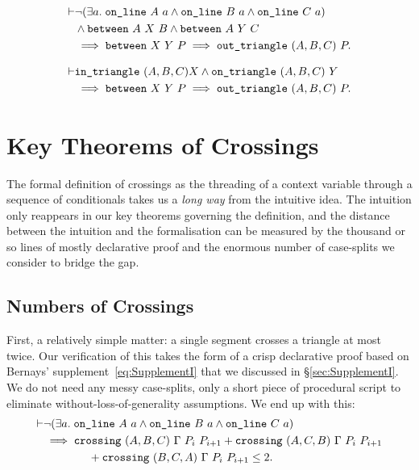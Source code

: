 \begin{equation}\label{eq:outTriangle1}
  \begin{split}
    \vdash&\neg(\exists a.\; \texttt{on\_line}\ A\ a\wedge \texttt{on\_line}\ B\ a\wedge \texttt{on\_line}\ C\ a)\\
    &\wedge \texttt{between}\ A\ X\ B \wedge \texttt{between}\ A\ Y\ C\\
    &\implies \texttt{between}\ X\ Y\ P \implies \texttt{out\_triangle}\ (A,B,C)\ P.
  \end{split}
\end{equation}

\begin{equation}\label{eq:outTriangle2}
  \begin{split}
    \vdash&\texttt{in\_triangle}\ (A,B,C) X \wedge \texttt{on\_triangle}\ (A,B,C)\ Y\\
    &\implies \texttt{between}\ X\ Y\ P \implies \texttt{out\_triangle}\ (A,B,C)\ P.
  \end{split}
\end{equation}

\section{Key Theorems of Crossings}\label{sec:CrossingVerification}
The formal definition of crossings as the threading of a context variable through a sequence of conditionals takes us a \emph{long way} from the intuitive idea. The intuition only reappears in our key theorems governing the definition, and the distance between the intuition and the formalisation can be measured by the thousand or so lines of mostly declarative proof and the enormous number of case-splits we consider to bridge the gap.

\subsection{Numbers of Crossings}
First, a relatively simple matter: a single segment crosses a triangle at most twice. Our verification of this takes the form of a crisp declarative proof based on Bernays' supplement~\eqref{eq:SupplementI} that we discussed in \S\ref{sec:SupplementI}. We do not need any messy case-splits, only a short piece of procedural script to eliminate without-loss-of-generality assumptions. We end up with this:
\begin{equation*}
  \begin{split}
    \vdash&\neg(\exists a.\; \texttt{on\_line}\ A\ a\wedge \texttt{on\_line}\ B\ a\wedge \texttt{on\_line}\ C\ a)\\
    &\implies \texttt{crossing}\ (A,B,C)\ \Gamma\ P_i\ P_{i+1} + \texttt{crossing}\ (A,C,B)\ \Gamma\ P_i\ P_{i+1}\\
    &\qquad\qquad+ \texttt{crossing}\ (B,C,A)\ \Gamma\ P_i\ P_{i+1} \leq 2.
  \end{split}
\end{equation*}


